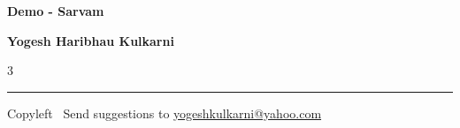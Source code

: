 \documentclass[8pt,landscape]{article}
\begin{document}
\footnotesize


\begin{center}
{\Large{\textbf{Demo - Sarvam}}}  

\textbf{Yogesh Haribhau Kulkarni}
\end{center}

\begin{multicols}{3}

\end{multicols}

\rule{\linewidth}{0.25pt}
\scriptsize
Copyleft \textcopyleft\  Send suggestions to 
\href{http://www.yogeshkulkarni.com}{yogeshkulkarni@yahoo.com}
\end{document}
